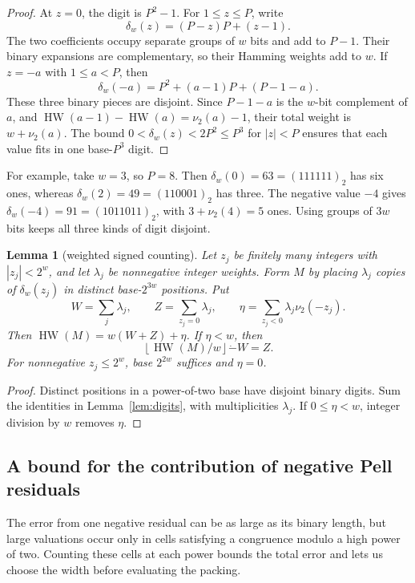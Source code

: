 \documentclass[11pt]{article}
\newtheorem{lemma}[theorem]{Lemma}
\theoremstyle{remark}
\newcommand{\tsub}{\mathbin{\dot{-}}}
\newcommand{\fl}[1]{\left\lfloor #1\right\rfloor}
\newcommand{\HW}{\operatorname{HW}}
\begin{document}
\begin{proof}
At $z=0$, the digit is $P^2-1$.
For $1\le z\le P$, write
\[
  \delta_w(z)=(P-z)P+(z-1).
\]
The two coefficients occupy separate groups of $w$ bits and add to
$P-1$. Their binary expansions are complementary, so their Hamming
weights add to $w$.
If $z=-a$ with $1\le a<P$, then
\[
  \delta_w(-a)=P^2+(a-1)P+(P-1-a).
\]
These three binary pieces are disjoint. Since $P-1-a$ is the $w$-bit
complement of $a$, and
$\HW(a-1)-\HW(a)=\nu_2(a)-1$, their total weight is
$w+\nu_2(a)$. The bound $0<\delta_w(z)<2P^2\le P^3$ for $|z|<P$
ensures that each value fits in one base-$P^3$ digit.
\end{proof}

For example, take $w=3$, so $P=8$.
Then $\delta_w(0)=63=(111111)_2$ has six ones, whereas
$\delta_w(2)=49=(110001)_2$ has three.
The negative value $-4$ gives
$\delta_w(-4)=91=(1011011)_2$, with $3+\nu_2(4)=5$ ones.
Using groups of $3w$ bits keeps all three kinds of digit disjoint.

\begin{lemma}[weighted signed counting]\label{lem:signed-count}
Let $z_j$ be finitely many integers with $|z_j|<2^w$, and let
$\lambda_j$ be nonnegative integer weights. Form $M$ by placing
$\lambda_j$ copies of $\delta_w(z_j)$ in distinct base-$2^{3w}$
positions. Put
\[
  W=\sum_j\lambda_j,\qquad Z=\sum_{z_j=0}\lambda_j,
  \qquad \eta=\sum_{z_j<0}\lambda_j\nu_2(-z_j).
\]
Then $\HW(M)=w(W+Z)+\eta$. If $\eta<w$, then
\begin{equation}\label{eq:signed-count}
  \fl{\HW(M)/w}\tsub W=Z.
\end{equation}
For nonnegative $z_j\le2^w$, base $2^{2w}$ suffices and $\eta=0$.
\end{lemma}

\begin{proof}
Distinct positions in a power-of-two base have disjoint binary digits.
Sum the identities in Lemma~\ref{lem:digits}, with multiplicities
$\lambda_j$. If $0\le\eta<w$, integer division by $w$ removes $\eta$.
\end{proof}

\subsection{A bound for the contribution of negative Pell residuals}

The error from one negative residual can be as large as its binary
length, but large valuations occur only in cells satisfying a congruence
modulo a high power of two. Counting these cells at each power bounds
the total error and lets us choose the width before evaluating the packing.
\end{document}
